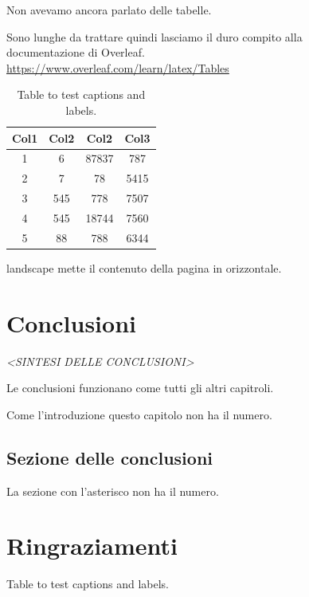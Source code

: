 \documentclass[envcountsame,envcountchap]{svmono}
\begin{document}
\begin{figure}
Non avevamo ancora parlato delle tabelle.

Sono lunghe da trattare quindi lasciamo il duro compito alla documentazione di Overleaf.
\url{https://www.overleaf.com/learn/latex/Tables}

\begin{table}[h!]
\centering
\begin{tabular}{||c c c c||} 
    \hline
    Col1 & Col2 & Col2 & Col3 \\ [0.5ex] 
    \hline\hline
    1 & 6 & 87837 & 787 \\ 
    2 & 7 & 78 & 5415 \\
    3 & 545 & 778 & 7507 \\
    4 & 545 & 18744 & 7560 \\
    5 & 88 & 788 & 6344 \\ [1ex] 
    \hline
\end{tabular}
\caption{Table to test captions and labels.}
\label{table:1}
\end{table}


\newpage
\begin{landscape}
landscape mette il contenuto della pagina in orizzontale.
\end{landscape}
    


\chapter*{Conclusioni}

\vspace{2cm}

\begin{flushright}
 \textit{<SINTESI DELLE CONCLUSIONI>}
\end{flushright}

\vspace{0.5cm}

Le conclusioni funzionano come tutti gli altri capitroli.

Come l'introduzione questo capitolo non ha il numero.

\section*{Sezione delle conclusioni}
La sezione con l'asterisco non ha il numero.

\chapter*{Ringraziamenti}


\end{figure}
\end{document}
